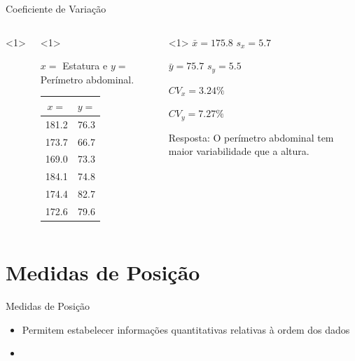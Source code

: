 \documentclass{beamer}
\begin{document}
\begin{frame}{Coeficiente de Variação}
  \begin{example}
    \begin{columns}<1>
      \begin{column}{5cm}<1>

        $x=$ Estatura e $y=$ Perímetro abdominal.

        \begin{tabular}{cc}
          $x=$ &$y=$\\
          \hline
          181.2 &76.3\\
          173.7&66.7\\
          169.0&73.3\\
          184.1&74.8\\
          174.4&82.7\\
          172.6&79.6\\
        \end{tabular}
      \end{column}
      \begin{column}{5cm}<1>
        $\bar{x} = 175.8$
        $s_x = 5.7$

        $\bar{y} = 75.7$
        $s_y = 5.5$

        \alert{$CV_x = %
          3.24\%$}

        \alert{$CV_y = %
          7.27\%$}

        Resposta: O perímetro abdominal tem maior variabilidade que a
        altura.
      \end{column}
    \end{columns}
  \end{example}

\end{frame}

\section{Medidas de Posição}

\begin{frame}{Medidas de Posição}
  \begin{itemize}
  \item Permitem estabelecer informações quantitativas relativas à
    ordem dos dados
  \item
  \end{itemize}
\end{frame}
\end{document}
